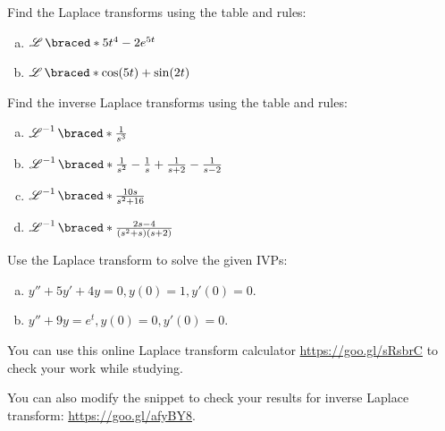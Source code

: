     \begin{question}
      Find the Laplace transforms using the table and rules:
      \begin{enumerate}[(a)]
        \item $\laplace\braced*{5t^4-2e^{5t}}$
        \item $\laplace \braced*{ \cos(5t)+\sin(2t) }$
      \end{enumerate}
    \end{question}

    \begin{question}
      Find the inverse Laplace transforms using the table and rules:
      \begin{enumerate}[(a)]
        \item $\laplace^{-1}\braced*{ \frac{1}{s^3} }$
        \item $\laplace^{-1}\braced*{\frac{1}{s^2}-\frac{1}{s} +\frac{1}{s+2} -\frac{1}{s-2}}$
        \item $\laplace^{-1}\braced*{\frac{10s}{s^2+16}}$
        \item $\laplace^{-1}\braced*{\frac{2s-4}{(s^2+s)(s+2)}}$
      \end{enumerate}
    \end{question}

    \begin{question}
      Use the Laplace transform to solve the given IVPs:
      \begin{enumerate}[(a)]
        \item $y''+5y'+4y = 0, y(0)=1, y'(0)=0.$
        \item $y''+9y = e^t, y(0)=0, y'(0)=0.$
      \end{enumerate}
    \end{question}


    \begin{fullwidth}
      You can use this online Laplace transform calculator \url{https://goo.gl/sRsbrC} to check your work while studying.

      \noindent You can also modify the \sage snippet to check your results for inverse Laplace transform: \url{https://goo.gl/afyBY8}.
    \end{fullwidth}